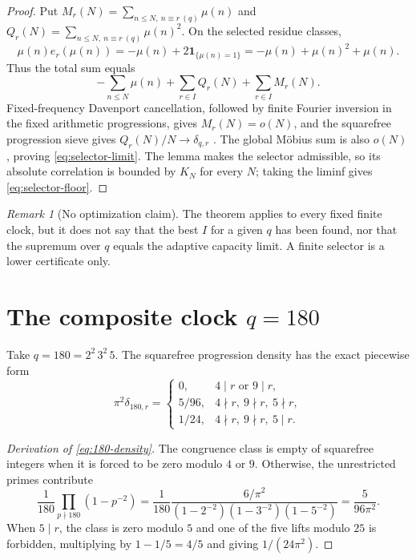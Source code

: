 \documentclass[11pt]{article}
\theoremstyle{definition}
\theoremstyle{remark}
\newtheorem{remark}[theorem]{Remark}
\newcommand{\Mob}{\mu}
\newcommand{\dd}{\delta}
\begin{document}
\begin{proof}
Put $M_r(N)=\sum_{n\le N,\ n\equiv r\ (q)}\Mob(n)$ and
$Q_r(N)=\sum_{n\le N,\ n\equiv r\ (q)}\Mob(n)^2$.  On the selected residue
classes,
\[
 \Mob(n)e_r(\Mob(n))
 =-\Mob(n)+2\mathbf 1_{\{\Mob(n)=1\}}
 =-\Mob(n)+\Mob(n)^2+\Mob(n).
\]
Thus the total sum equals
\[
 -\sum_{n\le N}\Mob(n)+\sum_{r\in I}Q_r(N)+\sum_{r\in I}M_r(N).
\]
Fixed-frequency Davenport cancellation, followed by finite Fourier inversion
in the fixed arithmetic progressions, gives $M_r(N)=o(N)$, and the squarefree progression sieve gives
$Q_r(N)/N\to\dd_{q,r}$ \cite{Davenport1937,Mirsky1948}.  The global
M\"obius sum is also $o(N)$, proving \eqref{eq:selector-limit}.  The lemma
makes the selector admissible, so its absolute correlation is bounded by
$K_N$ for every $N$; taking the liminf gives \eqref{eq:selector-floor}.
\end{proof}

\begin{remark}[No optimization claim]
The theorem applies to every fixed finite clock, but it does not say that the
best $I$ for a given $q$ has been found, nor that the supremum over $q$ equals
the adaptive capacity limit.  A finite selector is a lower certificate only.
\end{remark}

\section{\texorpdfstring{The composite clock $q=180$}{The composite clock q=180}}

Take $q=180=2^2\,3^2\,5$.  The squarefree progression density has the exact
piecewise form
\begin{equation}
 \pi^2\dd_{180,r}=
 \begin{cases}
 0,&4\mid r\text{ or }9\mid r,\\
 5/96,&4\nmid r,\ 9\nmid r,\ 5\nmid r,\\
 1/24,&4\nmid r,\ 9\nmid r,\ 5\mid r.
 \end{cases}
 \label{eq:180-density}
\end{equation}

\begin{proof}[Derivation of \eqref{eq:180-density}]
The congruence class is empty of squarefree integers when it is forced to be
zero modulo $4$ or $9$.  Otherwise, the unrestricted primes contribute
\[
 \frac1{180}\prod_{p\nmid180}(1-p^{-2})
 =\frac1{180}\frac{6/\pi^2}
 {(1-2^{-2})(1-3^{-2})(1-5^{-2})}
 =\frac5{96\pi^2}.
\]
When $5\mid r$, the class is zero modulo $5$ and one of the five lifts modulo
$25$ is forbidden, multiplying by $1-1/5=4/5$ and giving $1/(24\pi^2)$.
\end{proof}
\end{document}
